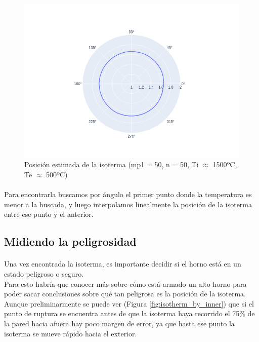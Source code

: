\documentclass[12pt]{article}
\begin{document}
\begin{figure}[H]
\centering
\includegraphics[scale=0.5]{complete.0.isotherm}
\caption{Posición estimada de la isoterma (mp1 = 50, n = 50, Ti \(\approx\) 1500ºC, Te \(\approx\) 500ºC)}
\label{fig:isotherm.pos}
\end{figure}

\paragraph{} Para encontrarla buscamos por ángulo el primer punto donde la temperatura es menor a la buscada, y luego interpolamos linealmente la posición de la isoterma entre ese punto y el anterior.

\subsection{Midiendo la peligrosidad}
\label{sec:peligrosidad.distance}

\paragraph{} Una vez encontrada la isoterma, es importante decidir si el horno está en un estado peligroso o seguro. \\
Para esto habría que conocer más sobre cómo está armado un alto horno para poder sacar conclusiones sobre qué tan peligrosa es la posición de la isoterma. Aunque preliminarmente se puede ver (Figura \ref{fig:isotherm_by_inner}) que si el punto de ruptura se encuentra antes de que la isoterma haya recorrido el 75\% de la pared hacia afuera hay poco margen de error, ya que hasta ese punto la isoterma se mueve rápido hacia el exterior.
\end{document}
